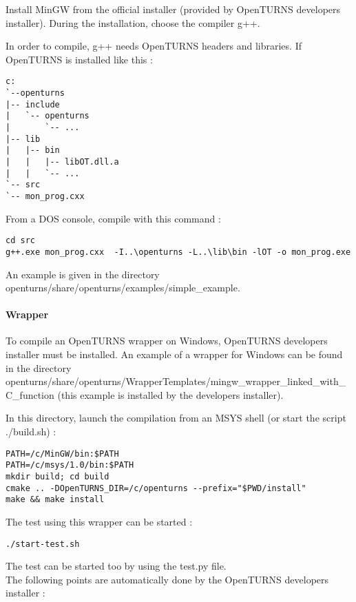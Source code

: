 Install MinGW from the official installer (provided by OpenTURNS developers installer). During the installation, choose the compiler g++.

In order to compile, g++ needs OpenTURNS headers and libraries.
If OpenTURNS is installed like this :
\begin{verbatim}
c:
`--openturns
|-- include
|   `-- openturns
|       `-- ...
|-- lib
|   |-- bin
|   |   |-- libOT.dll.a
|   |   `-- ...
`-- src
`-- mon_prog.cxx
\end{verbatim}

From a DOS console, compile with this command :
\begin{verbatim}
cd src
g++.exe mon_prog.cxx  -I..\openturns -L..\lib\bin -lOT -o mon_prog.exe
\end{verbatim}

An example is given in the directory openturns/share/openturns/examples/simple\_example.


\paragraph{Wrapper}

To compile an OpenTURNS wrapper on Windows, OpenTURNS developers installer must be installed.
An example of a wrapper for Windows can be found in the directory openturns/share/openturns/WrapperTemplates/mingw\_wrapper\_linked\_with\_C\_function (this example is installed by the developers installer).

In this directory, launch the compilation from an MSYS shell (or start the script ./build.sh) :
\begin{verbatim}
PATH=/c/MinGW/bin:$PATH
PATH=/c/msys/1.0/bin:$PATH
mkdir build; cd build
cmake .. -DOpenTURNS_DIR=/c/openturns --prefix="$PWD/install"
make && make install
\end{verbatim}

The test using this wrapper can be started :
\begin{verbatim}
./start-test.sh
\end{verbatim}
The test can be started too by using the test.py file.\\

The following points are automatically done by the OpenTURNS developers installer :

